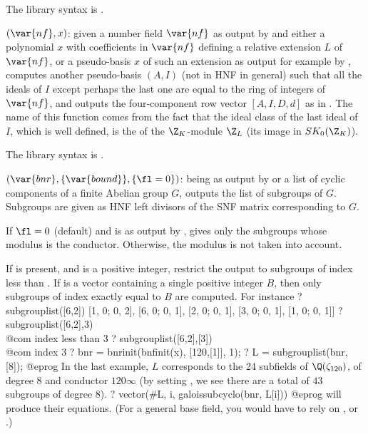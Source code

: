 The library syntax is .

$(\var{nf},x)$: \label{se:rnfsteinitz}given a number field $\var{nf}$ as
output by  and either a polynomial $x$ with coefficients in
$\var{nf}$ defining a relative extension $L$ of $\var{nf}$, or a pseudo-basis
$x$ of such an extension as output for example by ,
computes another pseudo-basis $(A,I)$ (not in HNF in general) such that all
the ideals of $I$ except perhaps the last one are equal to the ring of
integers of $\var{nf}$, and outputs the four-component row vector $[A,I,D,d]$
as in . The name of this function comes from the fact
that the ideal class of the last ideal of $I$, which is well defined, is the
 of the $\Z_K$-module $\Z_L$ (its image in $SK_0(\Z_K)$).

The library syntax is .

$(\var{bnr},\{\var{bound}\},\{\fl=0\})$: \label{se:subgrouplist} being as output by  or a list of cyclic components
of a finite Abelian group $G$, outputs the list of subgroups of $G$. Subgroups
are given as HNF left divisors of the SNF matrix corresponding to $G$.

If $\fl=0$ (default) and  is as output by , gives
only the subgroups whose modulus is the conductor. Otherwise, the modulus is
not taken into account.

If  is present, and is a positive integer, restrict the output to
subgroups of index less than . If  is a vector
containing a single positive integer $B$, then only subgroups of index
exactly equal to $B$ are computed. For instance
\bprog
? subgrouplist([6,2])
[1, 0; 0, 2], [6, 0; 0, 1], [2, 0; 0, 1], [3, 0; 0, 1], [1, 0; 0, 1]]
? subgrouplist([6,2],3)    \\@com index less than 3
? subgrouplist([6,2],[3])  \\@com index 3
? bnr = bnrinit(bnfinit(x), [120,[1]], 1);
? L = subgrouplist(bnr, [8]);
@eprog\noindent
In the last example, $L$ corresponds to the 24 subfields of
$\Q(\zeta_{120})$, of degree $8$ and conductor $120\infty$ (by setting \fl,
we see there are a total of $43$ subgroups of degree $8$).
\bprog
? vector(#L, i, galoissubcyclo(bnr, L[i]))
@eprog\noindent
will produce their equations. (For a general base field, you would
have to rely on , or .)

